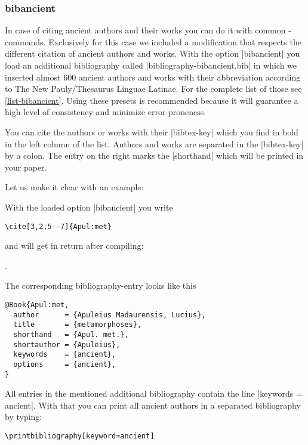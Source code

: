 \documentclass[a4paper,
10pt,
greek,
french,
spanish,
italian,
ngerman,
english
]{ltxdoc}
\begin{document}
\subsubsection{bibancient}\label{bibancient}
In case of citing ancient authors and their works you can do it with common -commands.
Exclusively for this case we included a modification that respects the different citation of ancient authors and works.
With the option |bibancient| you load an additional bibliography called |bibliography-bibancient.bib| in which we inserted almost 600 ancient authors and works with their abbreviation according to The New Pauly/Thesaurus Linguae Latinae.
For the complete list of those see \cref{list-bibancient}.
Using these presets is recommended because it will guarantee a high level of consistency and minimize error-proneness.

You can cite the authors or works with their |bibtex-key| which you find in bold in the left column of the list. 
Authors and works are separated in the |bibtex-key| by a colon.
The entry on the right marks the |shorthand| which will be printed in your paper.

Let us make it clear with an example:
\begin{refsection}
With the loaded option |bibancient| you write  

\begin{lstlisting}
\cite[3,2,5--7]{Apul:met} 
\end{lstlisting}

and will get in return after compiling: 

\cite[3,2,5--7]{Apul:met}.
\end{refsection}

The corresponding bibliography-entry looks like this
\begin{lstlisting}[style=bibentry,label=Apul:met,caption={{@}Book\{Apul:met,…\} }]
@Book{Apul:met,
  author      = {Apuleius Madaurensis, Lucius},
  title       = {metamorphoses},
  shorthand   = {Apul. met.},
  shortauthor = {Apuleius},
  keywords    = {ancient},
  options     = {ancient},
}
\end{lstlisting}
All entries in the mentioned additional bibliography contain the line |keywords = {ancient}|.
With that you can print all ancient authors in a separated bibliography by typing:
\begin{lstlisting}
\printbibliography[keyword=ancient]
\end{lstlisting}
\end{document}
